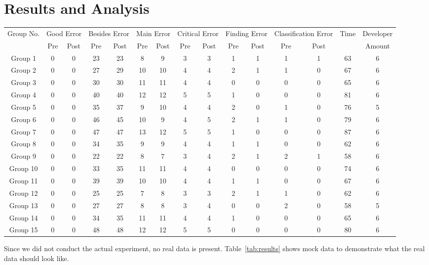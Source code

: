 \section{Results and Analysis}

\begin{table*}[t]
\centering
\begin{tabular}{c|cccccccccccccc}
  Group No. &  \multicolumn{2}{r}{Good Error} & \multicolumn{2}{r}{Besides Error} & \multicolumn{2}{r}{Main Error} & \multicolumn{2}{r}{Critical Error} & \multicolumn{2}{r}{Finding Error} & \multicolumn{2}{r}{Classification Error} & Time & Developer\\
  & Pre & Post & Pre & Post & Pre & Post & Pre & Post & Pre & Post & Pre & Post & & Amount  \\
  \hline
  Group 1 &0&0&23&23&8&9&3&3&1&1&1&1&63&6 \\
  Group 2 &0&0&27&29&10&10&4&4&2&1&1&0&67&6 \\
  Group 3 &0&0&30&30&11&11&4&4&0&0&0&0&65&6 \\
  Group 4 &0&0&40&40&12&12&5&5&1&0&0&0&81&6 \\
  Group 5 &0&0&35&37&9&10&4&4&2&0&1&0&76&5 \\
  Group 6 &0&0&46&45&10&9&4&5&2&1&1&0&79&6 \\
  Group 7 &0&0&47&47&13&12&5&5&1&0&0&0&87&6 \\
  Group 8 &0&0&34&35&9&9&4&4&1&1&0&0&62&6 \\
  Group 9 &0&0&22&22&8&7&3&4&2&1&2&1&58&6 \\
  Group 10 &0&0&33&35&11&11&4&4&0&0&0&0&74&6 \\
  Group 11 &0&0&39&39&10&10&4&4&1&1&0&0&67&6 \\
  Group 12 &0&0&25&25&7&8&3&3&2&1&1&0&62&6 \\
  Group 13 &0&0&27&27&8&8&3&4&0&0&2&0&58&5 \\
  Group 14 &0&0&34&35&11&11&4&4&1&0&0&0&65&6 \\
  Group 15 &0&0&48&48&12&12&5&5&0&0&0&0&80&6 \\
\end{tabular}
\caption{Mock data of the quantitative data collection.}
\label{tab:results}
\end{table*}

Since we did not conduct the actual experiment, no real data is present. Table~\ref{tab:results} shows mock data to demonstrate what the real data should look like.